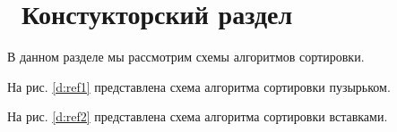 \chapter{ Констукторский раздел}
\label{cha:design}

В данном разделе мы рассмотрим схемы алгоритмов сортировки.

На рис. \ref{d:ref1} представлена схема алгоритма сортировки пузырьком.

\begin{figure}[ht!]
\end{figure}

На рис. \ref{d:ref2} представлена схема алгоритма сортировки вставками.

\begin{figure}[ht!]
\end{figure}

